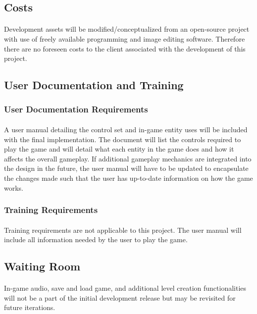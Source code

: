 \documentclass[12pt, titlepage]{article}
\begin{document}
\subsection{Costs}
\paragraph{}
Development assets will be modified/conceptualized from an open-source project with use of freely available programming and image editing software. Therefore there are no foreseen costs to the client associated with the development of this project.

\subsection{User Documentation and Training}

\subsubsection{User Documentation Requirements}
\paragraph{}
A user manual detailing the control set and in-game entity uses will be included with the final implementation. The document will list the controls required to play the game and will detail what each entity in the game does and how it affects the overall gameplay. If additional gameplay mechanics are integrated into the design in the future, the user manual will have to be updated to encapsulate the changes made such that the user has up-to-date information on how the game works.

\subsubsection{Training Requirements}
\paragraph{}
Training requirements are not applicable to this project. The user manual will include all information needed by the user to play the game.

\subsection{Waiting Room}
\paragraph{}
In-game audio, save and load game, and additional level creation functionalities will not be a part of the initial development release but may be revisited for future iterations.
\end{document}
